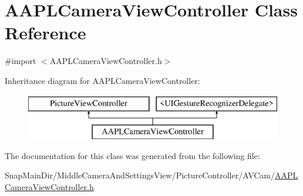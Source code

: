\hypertarget{interface_a_a_p_l_camera_view_controller}{}\section{A\+A\+P\+L\+Camera\+View\+Controller Class Reference}
\label{interface_a_a_p_l_camera_view_controller}


{\ttfamily \#import $<$A\+A\+P\+L\+Camera\+View\+Controller.\+h$>$}

Inheritance diagram for A\+A\+P\+L\+Camera\+View\+Controller\+:\begin{figure}[H]
\begin{center}
\leavevmode
\includegraphics[height=2.000000cm]{interface_a_a_p_l_camera_view_controller}
\end{center}
\end{figure}


The documentation for this class was generated from the following file\+:\begin{DoxyCompactItemize}
\item 
Snap\+Main\+Dir/\+Middle\+Camera\+And\+Settings\+View/\+Picture\+Controller/\+A\+V\+Cam/\hyperlink{_a_a_p_l_camera_view_controller_8h}{A\+A\+P\+L\+Camera\+View\+Controller.\+h}\end{DoxyCompactItemize}

